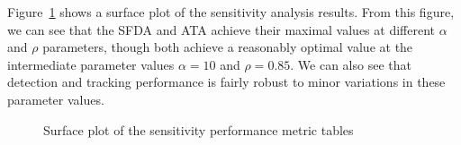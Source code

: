 \documentclass[smallcondensed, final]{svjour3}
\begin{document}
Figure~\ref{fig:sens_surf} shows a surface plot of the sensitivity analysis results. From this figure, we can see that the SFDA and ATA achieve their maximal values at different $\alpha$ and $\rho$ parameters, though both achieve a reasonably optimal value at the intermediate parameter values $\alpha = 10$ and $\rho = 0.85$. We can also see that detection and tracking performance is fairly robust to minor variations in these parameter values.





\begin{figure}[!]
  \centering             
  \caption{Surface plot of the sensitivity performance metric tables}
  \label{fig:sens_surf}
\end{figure}




\end{document}
